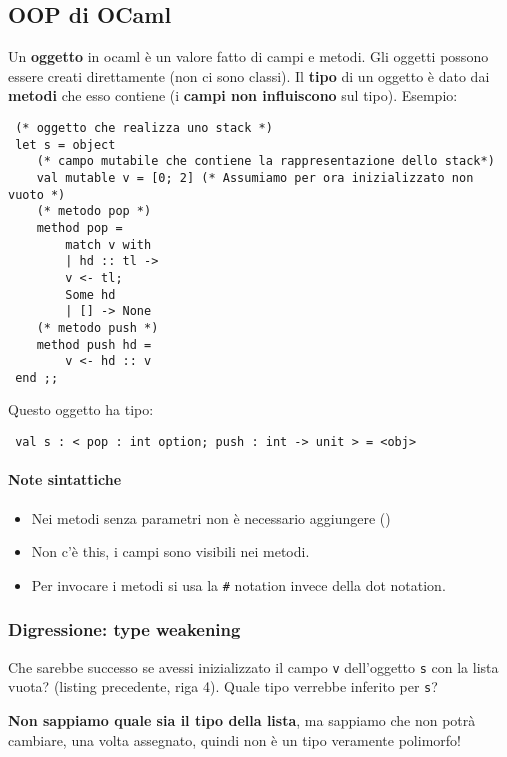 \documentclass[a4paper,10pt]{article}
\begin{document}
\newpage

\subsection{OOP di OCaml}

Un \textbf{oggetto} in ocaml è un valore fatto di campi e metodi. Gli oggetti possono essere creati direttamente (non ci sono classi). Il \textbf{tipo} di un oggetto è dato dai \textbf{metodi} che esso contiene (i \textbf{campi non influiscono} sul tipo). Esempio:

\begin{lstlisting}
 (* oggetto che realizza uno stack *)
 let s = object
    (* campo mutabile che contiene la rappresentazione dello stack*)
    val mutable v = [0; 2] (* Assumiamo per ora inizializzato non vuoto *)
    (* metodo pop *)
    method pop =
        match v with
        | hd :: tl ->
        v <- tl;
        Some hd
        | [] -> None
    (* metodo push *)
    method push hd =
        v <- hd :: v
 end ;;
\end{lstlisting}

Questo oggetto ha tipo: 
\begin{lstlisting}
 val s : < pop : int option; push : int -> unit > = <obj>

\end{lstlisting}

\paragraph{Note sintattiche}
\begin{itemize}
 \item Nei metodi senza parametri non è necessario aggiungere ()
 \item Non c'è this, i campi sono visibili nei metodi.
 \item Per invocare i metodi si usa la \texttt{\#} notation invece della dot notation.
\end{itemize}

\subsubsection{Digressione: type weakening}

Che sarebbe successo se avessi inizializzato il campo \texttt v dell'oggetto \texttt s con la lista vuota? (listing precedente, riga 4). Quale tipo verrebbe inferito per \texttt s?\smallskip

\textbf{Non sappiamo quale sia il tipo della lista}, ma sappiamo che non potrà cambiare, una volta assegnato, quindi non è un tipo veramente polimorfo!\smallskip
\end{document}
